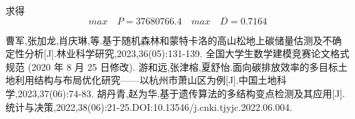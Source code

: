 \documentclass[withoutpreface,bwprint]{cumcmthesis} %
\begin{document}
求得
\begin{equation}
	max \quad P=37680766.4 \quad max \quad D=0.7164
\end{equation}
\begin{thebibliography}{9}%
     曹军,张加龙,肖庆琳,等.基于随机森林和蒙特卡洛的高山松地上碳储量估测及不确定性分析[J].林业科学研究,2023,36(05):131-139.
    全国大学生数学建模竞赛论文格式规范 (2020 年 8 月 25 日修改).
     游和远,张津榕,夏舒怡.面向碳排放效率的多目标土地利用结构与布局优化研究——以杭州市萧山区为例[J].中国土地科学,2023,37(06):74-83.
       胡丹青,赵为华.基于遗传算法的多结构变点检测及其应用[J].统计与决策,2022,38(06):21-25.DOI:10.13546/j.cnki.tjyjc.2022.06.004.
\end{thebibliography}
\end{document}
